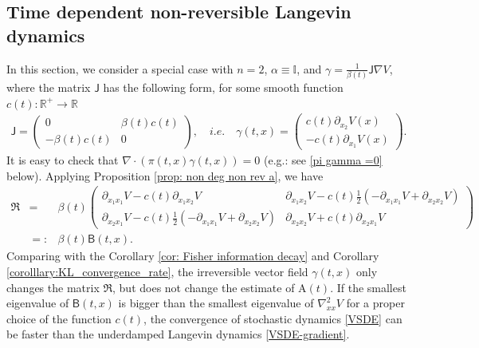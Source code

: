 \documentclass[11pt,reqno]{amsart}
\newcommand{\bea}{\begin{eqnarray}}
\newcommand{\eea}{\end{eqnarray}}
\newcommand{\beaa}{\begin{eqnarray*}}
\newcommand{\eeaa}{\end{eqnarray*}}
\begin{document}
\subsection{Time dependent non-reversible Langevin dynamics %
}\label{sec:nonreversible_example}
In this section, we consider a special case with $n=2$, $\alpha\equiv \mathbb I$, and $\gamma= \frac{1}{\beta(t)}\mathsf J \nabla V$, where the matrix $\mathsf J$ has the following form, for some smooth function $c(t): \mathbb R^+\rightarrow \mathbb R$
\beaa 
\mathsf J=\begin{pmatrix} 
0&\beta(t)c(t)\\
-\beta(t) c(t)&0
\end{pmatrix}, \quad i.e.\quad \gamma(t,x)=\begin{pmatrix}c(t)\partial_{x_2}V(x)\\
-c(t)\partial_{x_1}V(x)
\end{pmatrix}.
\eeaa 
It is easy to check that $\nabla\cdot(\pi(t,x)\gamma(t,x))=0$ (e.g.: see \eqref{pi gamma =0} below). Applying Proposition \ref{prop: non deg non rev a}, we have 
\bea
\mathfrak R 
&=& \beta(t)\begin{pmatrix}
     \partial_{x_1x_1}V-c(t) \partial_{x_1x_2}V & \partial_{x_1x_2}V-c(t)\frac{1}{2} ( - \partial_{x_1x_1}V+ \partial_{x_2x_2}V ) \\
    \partial_{x_2x_1}V-c(t)\frac{1}{2} ( - \partial_{x_1x_1}V+ \partial_{x_2x_2}V )  & \partial_{x_2x_2}V +c(t)\partial_{x_2x_1}V
\end{pmatrix}\nonumber\\
&=:&\beta(t) \mathsf B(t,x).
\eea
Comparing with the Corollary \ref{cor: Fisher information decay} and Corollary \ref{corolllary:KL_convergence_rate}, the irreversible vector field $\gamma(t,x)$ only changes the matrix $\mathfrak R$, but does not change the estimate of $\mathrm A(t)$. If the smallest eigenvalue of $\mathsf B(t,x)$ is bigger than the smallest eigenvalue of $\nabla^2_{xx}V$ for a proper choice of the function $c(t)$, the convergence of stochastic dynamics \eqref{VSDE} can be faster than the underdamped Langevin dynamics \eqref{VSDE-gradient}.
\end{document}
